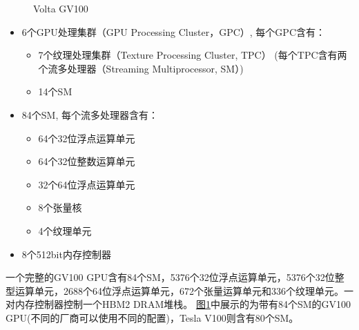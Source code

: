 \documentclass[letterpaper,10pt,english]{sphinxmanual}
\let\sphinxpxdimen\pdfpxdimen\else\newdimen\sphinxpxdimen
\begin{document}
\begin{figure}[H]
\centering
\capstart

\noindent\sphinxincludegraphics[width=800\sphinxpxdimen]{{V100}.svg}
\caption{Volta GV100}\label{\detokenize{chapter_accelerator/accelerator_architecture:id7}}\label{\detokenize{chapter_accelerator/accelerator_architecture:gv100}}\end{figure}
\begin{itemize}
\item {} 
\sphinxAtStartPar
6个GPU处理集群（GPU Processing Cluster，GPC）, 每个GPC含有：
\begin{itemize}
\item {} 
\sphinxAtStartPar
7个纹理处理集群（Texture Processing Cluster, TPC）
(每个TPC含有两个流多处理器（Streaming Multiprocessor, SM）)

\item {} 
\sphinxAtStartPar
14个SM

\end{itemize}

\item {} 
\sphinxAtStartPar
84个SM, 每个流多处理器含有：
\begin{itemize}
\item {} 
\sphinxAtStartPar
64个32位浮点运算单元

\item {} 
\sphinxAtStartPar
64个32位整数运算单元

\item {} 
\sphinxAtStartPar
32个64位浮点运算单元

\item {} 
\sphinxAtStartPar
8个张量核

\item {} 
\sphinxAtStartPar
4个纹理单元

\end{itemize}

\item {} 
\sphinxAtStartPar
8个512\sphinxhyphen{}bit内存控制器

\end{itemize}

\sphinxAtStartPar
一个完整的GV100
GPU含有84个SM，5376个32位浮点运算单元，5376个32位整型运算单元，2688个64位浮点运算单元，672个张量运算单元和336个纹理单元。一对内存控制器控制一个HBM2
DRAM堆栈。 \hyperref[\detokenize{chapter_accelerator/accelerator_architecture:gv100}]{图\ref{\detokenize{chapter_accelerator/accelerator_architecture:gv100}}}中展示的为带有84个SM的GV100
GPU(不同的厂商可以使用不同的配置)，Tesla V100则含有80个SM。
\end{document}
